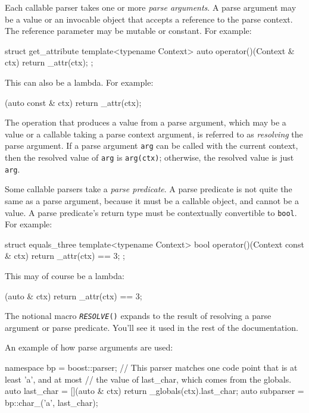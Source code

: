 Each callable parser takes one or more \emph{parse arguments}. A parse argument may be a value or an invocable object that accepts a reference to the parse context. The reference parameter may be mutable or constant. For example:

\begin{code}
struct get_attribute
{
    template<typename Context>
    auto operator()(Context & ctx)
    {
        return _attr(ctx);
    }
};
\end{code}

This can also be a lambda. For example:

\begin{code}
[](auto const & ctx) { return _attr(ctx); }
\end{code}

The operation that produces a value from a parse argument, which may be a value or a callable taking a parse context argument, is referred to as \emph{resolving} the parse argument. If a parse argument \texttt{arg} can be called with the current context, then the resolved value of \texttt{arg} is \texttt{arg(ctx)}; otherwise, the resolved value is just \texttt{arg}.

Some callable parsers take a \emph{parse predicate}. A parse predicate is not quite the same as a parse argument, because it must be a callable object, and cannot be a value. A parse predicate's return type must be contextually convertible to \texttt{bool}. For example:

\begin{code}
struct equals_three
{
    template<typename Context>
    bool operator()(Context const & ctx)
    {
        return _attr(ctx) == 3;
    }
};
\end{code}

This may of course be a lambda:

\begin{code}
[](auto & ctx) { return _attr(ctx) == 3; }
\end{code}

The notional macro \emph{\texttt{RESOLVE}}\texttt{()} expands to the result of resolving a parse argument or parse predicate. You'll see it used in the rest of the documentation.

An example of how parse arguments are used:

\begin{code}
namespace bp = boost::parser;
// This parser matches one code point that is at least 'a', and at most
// the value of last_char, which comes from the globals.
auto last_char = [](auto & ctx) { return _globals(ctx).last_char; }
auto subparser = bp::char_('a', last_char);
\end{code}

